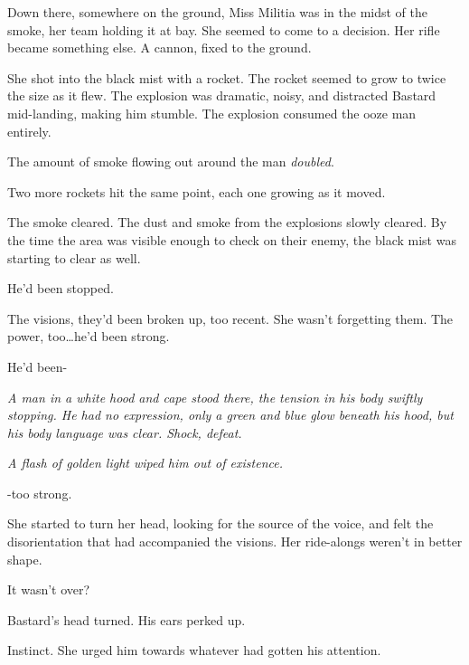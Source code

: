 Down there, somewhere on the ground, Miss Militia was in the midst of the smoke, her team holding it at bay.  She seemed to come to a decision.  Her rifle became something else.  A cannon, fixed to the ground.



She shot into the black mist with a rocket.  The rocket seemed to grow to twice the size as it flew.  The explosion was dramatic, noisy, and distracted Bastard mid-landing, making him stumble.  The explosion consumed the ooze man entirely.



The amount of smoke flowing out around the man\emph{ doubled}.



Two more rockets hit the same point, each one growing as it moved.



The smoke cleared.  The dust and smoke from the explosions slowly cleared.  By the time the area was visible enough to check on their enemy, the black mist was starting to clear as well.



He'd been stopped.



The visions, they'd been broken up, too recent.  She wasn't forgetting them.  The power, too\ldots he'd been strong.



He'd been-



\emph{A man in a white hood and cape stood there, the tension in his body swiftly stopping.  He had no expression, only a green and blue glow beneath his hood, but his body language was clear.  Shock, defeat.}



\emph{A flash of golden light wiped him out of existence.}



-too strong.



She started to turn her head, looking for the source of the voice, and felt the disorientation that had accompanied the visions.  Her ride-alongs weren't in better shape.



It wasn't over?



Bastard's head turned.  His ears perked up.



Instinct.  She urged him towards whatever had gotten his attention.



